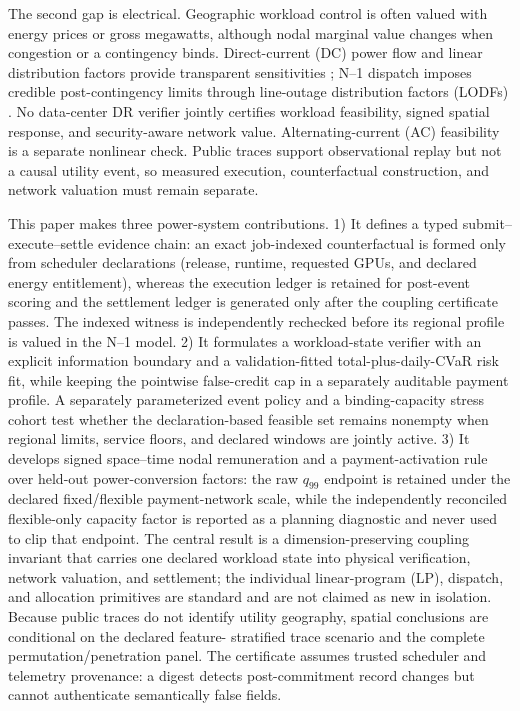 \documentclass[10pt,journal]{IEEEtran}
\begin{document}
The second gap is electrical. Geographic workload control is often valued with
energy prices or gross megawatts, although nodal marginal value changes when
congestion or a contingency binds. Direct-current (DC) power flow and linear distribution
factors provide transparent sensitivities \cite{stott2009dc,zimmerman2011matpower};
N--1 dispatch imposes credible post-contingency limits through line-outage
distribution factors (LODFs) \cite{tejada2018lodf}. No data-center DR verifier
jointly certifies workload feasibility, signed spatial response, and
security-aware network value. Alternating-current (AC) feasibility is a separate
nonlinear check. Public traces support observational
replay but not a causal utility event, so measured execution, counterfactual
construction, and network valuation must remain separate.

This paper makes three power-system contributions. 1) It defines a typed
submit--execute--settle evidence chain: an exact job-indexed counterfactual is
formed only from scheduler declarations (release, runtime, requested GPUs,
and declared energy entitlement), whereas the execution ledger is retained
for post-event scoring and the settlement ledger is generated only after the
coupling certificate passes. The indexed witness is independently rechecked
before its regional profile is valued in the N--1 model. 2) It formulates a
workload-state verifier with an explicit information boundary and a
validation-fitted total-plus-daily-CVaR risk fit, while keeping the pointwise
false-credit cap in a separately auditable payment profile. A separately
parameterized event policy and a binding-capacity stress cohort test whether
the declaration-based feasible set remains nonempty when regional limits,
service floors, and declared windows are jointly active. 3) It develops signed
space--time nodal remuneration and a payment-activation rule over held-out
power-conversion factors: the raw $q_{99}$ endpoint is retained under the
declared fixed/flexible payment-network scale, while the independently
reconciled flexible-only capacity factor is reported as a planning diagnostic
and never used to clip that endpoint. The central result is a
dimension-preserving coupling invariant that carries one declared workload
state into physical verification, network valuation, and settlement; the
individual linear-program (LP), dispatch, and allocation primitives are standard and are not
claimed as new in isolation. Because public traces do not identify utility
geography, spatial conclusions are conditional on the declared feature-
stratified trace scenario and the complete permutation/penetration panel.
The certificate assumes trusted scheduler and telemetry provenance: a digest
detects post-commitment record changes but cannot authenticate semantically
false fields.
\end{document}
